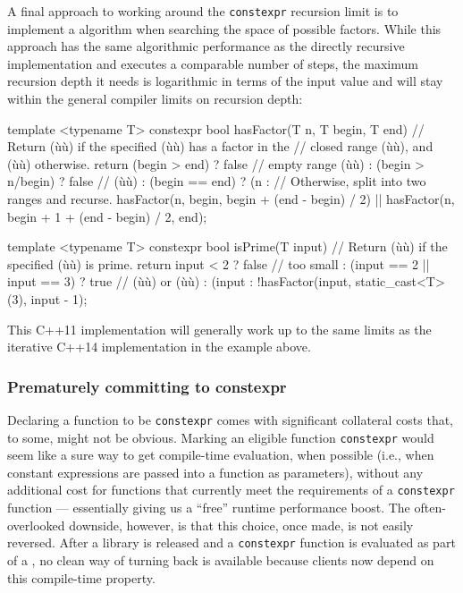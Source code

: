 A final approach to working around the \lstinline!constexpr! recursion
limit is to implement a  algorithm when
searching the space of possible factors. While this approach has the
same algorithmic performance as the directly recursive implementation
and executes a comparable number of steps, the maximum recursion depth
it needs is logarithmic in terms of the input value and will stay within
the general compiler limits on recursion depth:

\begin{emcppslisting}
template <typename T>
constexpr bool hasFactor(T n, T begin, T end)
    // Return (ù{}ù) if the specified (ù{}ù) has a factor in the
    // closed range (ù{}ù), and (ù{}ù) otherwise.
{
    return (begin > end)     ? false             // empty range (ù{}ù)
         : (begin > n/begin) ? false             // (ù{}ù)
         : (begin == end)    ? (n %
         :   // Otherwise, split into two ranges and recurse.
             hasFactor(n, begin, begin + (end - begin) / 2) ||
             hasFactor(n, begin + 1 + (end - begin) / 2, end);
}

template <typename T>
constexpr bool isPrime(T input)
    // Return (ù{}ù) if the specified (ù{}ù) is prime.
{
    return input < 2                  ? false  // too small
         : (input == 2 || input == 3) ? true   // (ù{}ù) or (ù{}ù)
         : (input %
         : !hasFactor(input, static_cast<T>(3), input - 1);
}
\end{emcppslisting}


\noindent This C++11 implementation will generally work up to the same limits as
the iterative C++14 implementation in the example above.

\subsubsection[Prematurely committing to \lstinline!constexpr!]{Prematurely committing to {\SubsubsecCode constexpr}}\label{prematurely-committing-to-constexpr}

Declaring a function to be \lstinline!constexpr! comes with significant
collateral costs that, to some, might not be obvious. Marking an
eligible function \lstinline!constexpr! would seem like a sure way to get
compile-time evaluation, when possible (i.e., when constant expressions
are passed into a function as parameters), without any additional cost
for functions that currently meet the requirements of a
\lstinline!constexpr! function --- essentially giving us a ``free'' runtime
performance boost. The often-overlooked downside, however, is that this
choice, once made, is not easily reversed. After a library is released
and a \lstinline!constexpr! function is evaluated as part of a
, no clean way of turning back is available
because clients now depend on this compile-time property.

